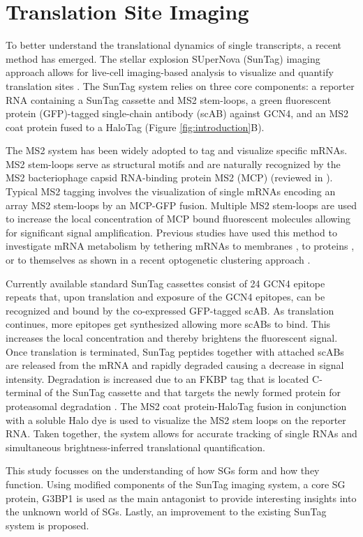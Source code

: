     
\section{Translation Site Imaging} \label{translation_site_imaging}

To better understand the translational dynamics of single transcripts, a recent method has emerged.
The stellar explosion SUperNova (SunTag) imaging approach allows for live-cell imaging-based analysis to visualize and quantify translation sites \cite{tanenbaum_protein-tagging_2014}.
The SunTag system relies on three core components: a reporter RNA containing a SunTag cassette and MS2 stem-loops, a green fluorescent protein (GFP)-tagged single-chain antibody (scAB) against GCN4, and an MS2 coat protein fused to a HaloTag (Figure \ref{fig:introduction}B).

The MS2 system has been widely adopted to tag and visualize specific mRNAs.
MS2 stem-loops serve as structural motifs and are naturally recognized by the MS2 bacteriophage capsid RNA-binding protein MS2 (MCP) (reviewed in \cite{george_intracellular_2018}).
Typical MS2 tagging involves the visualization of single mRNAs encoding an array MS2 stem-loops by an MCP-GFP fusion.
Multiple MS2 stem-loops are used to increase the local concentration of MCP bound fluorescent molecules allowing for significant signal amplification.
Previous studies have used this method to investigate mRNA metabolism by tethering mRNAs to membranes \cite{genz_association_2013}, to proteins \cite{bos_tethered_2016}, or to themselves as shown in a recent optogenetic clustering approach \cite{kim_optogenetic_2020}.

Currently available standard SunTag cassettes consist of 24 GCN4 epitope repeats that, upon translation and exposure of the GCN4 epitopes, can be recognized and bound by the co-expressed GFP-tagged scAB.
As translation continues, more epitopes get synthesized allowing more scABs to bind.
This increases the local concentration and thereby brightens the fluorescent signal.
Once translation is terminated, SunTag peptides together with attached scABs are released from the mRNA and rapidly degraded causing a decrease in signal intensity.
Degradation is increased due to an FKBP tag that is located C-terminal of the SunTag cassette and that targets the newly formed protein for proteasomal degradation \cite{azevedo_systematic_2012}.
The MS2 coat protein-HaloTag fusion in conjunction with a soluble Halo dye is used to visualize the MS2 stem loops on the reporter RNA.
Taken together, the system allows for accurate tracking of single RNAs and simultaneous brightness-inferred translational quantification.

This study focusses on the understanding of how SGs form and how they function.
Using modified components of the SunTag imaging system, a core SG protein, G3BP1 is used as the main antagonist to provide interesting insights into the unknown world of SGs.
Lastly, an improvement to the existing SunTag system is proposed.
